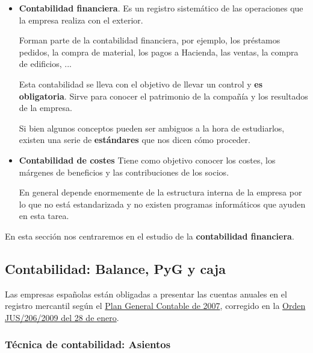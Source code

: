 \documentclass[nochap,palatino,shortheader]{apuntes}
\begin{document}
\begin{itemize}
\item \textbf{Contabilidad financiera}. Es un registro sistemático de las operaciones que la empresa realiza con el exterior.

Forman parte de la contabilidad financiera, por ejemplo, los préstamos pedidos, la compra de material, los pagos a Hacienda, las ventas, la compra de edificios, ...

Esta contabilidad se lleva con el objetivo de llevar un control y \textbf{es obligatoria}. Sirve para conocer el patrimonio de la compañía y los resultados de la empresa.

Si bien algunos conceptos pueden ser ambiguos a la hora de estudiarlos, existen una serie de \textbf{estándares} que nos dicen cómo proceder.

\item \textbf{Contabilidad de costes} Tiene como objetivo conocer los costes, los márgenes de beneficios y las contribuciones de los socios.

En general depende enormemente de la estructura interna de la empresa por lo que no está estandarizada y no existen programas informáticos que ayuden en esta tarea.
\end{itemize}

En esta sección nos centraremos en el estudio de la \textbf{contabilidad financiera}.

\subsection{Contabilidad: Balance, PyG y caja}
\label{sec:Contabilidad}

Las empresas españolas están obligadas a presentar las cuentas anuales en el registro mercantil según el \href{https://www.boe.es/buscar/doc.php?id=BOE-A-2007-13023}{Plan General Contable de 2007}, corregido en la \href{https://www.boe.es/boe/dias/2009/02/10/pdfs/BOE-A-2009-2276.pdf}{Orden JUS/206/2009 del 28 de enero}.

\subsubsection{Técnica de contabilidad: Asientos}
\end{document}
